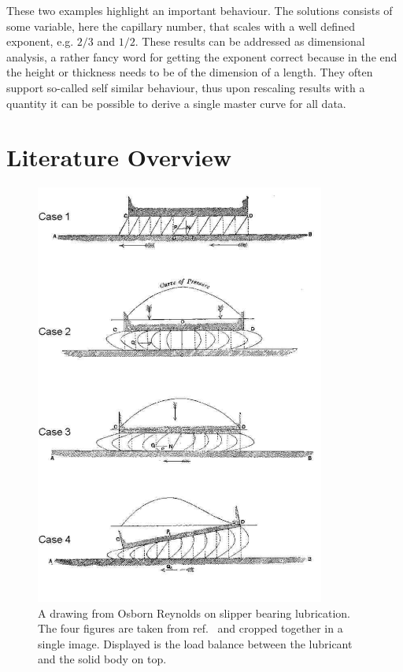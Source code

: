 These two examples highlight an important behaviour.
The solutions consists of some variable, here the capillary number, that scales with a well defined exponent, e.g. $2/3$ and $1/2$.
These results can be addressed as dimensional analysis, a rather fancy word for getting the exponent correct because in the end the height or thickness needs to be of the dimension of a length.
They often support so-called self similar behaviour, thus upon rescaling results with a quantity it can be possible to derive a single master curve for all data. 

\section{Literature Overview}
\label{section:literature}
\begin{figure}
    \centering
    \includegraphics[width=0.85\textwidth]{graphics/reynolds_slip_bearing.pdf}
    \caption{A drawing from Osborn Reynolds on slipper bearing lubrication.
    The four figures are taken from ref.~\cite{ReynoldsLubr} and cropped together in a single image.
    Displayed is the load balance between the lubricant and the solid body on top.}
    \label{fig:reynolds_work}
\end{figure}
